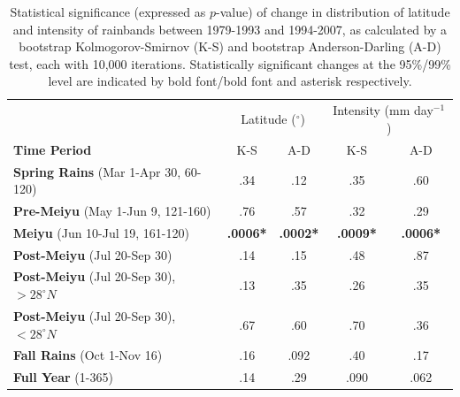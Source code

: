 \documentclass[singlecolumn,11pt]{pnas-new}
\begin{document}
\begin{table}[p]

\centering

\caption{Statistical significance (expressed as $p$-value) of change in distribution of latitude and intensity of rainbands between 1979-1993 and 1994-2007, as calculated by a bootstrap Kolmogorov-Smirnov (K-S) and bootstrap Anderson-Darling (A-D) test, each with 10,000 iterations. Statistically significant changes at the 95\%/99\% level are indicated by bold font/bold font and asterisk respectively.}

\begin{tabular}{ l c c c c}
												& \multicolumn{2}{c}{Latitude ($^\circ$)} & \multicolumn{2}{c}{Intensity (mm day$^{-1}$)} \\
	 \textbf{Time Period} 							& K-S 			& A-D 			& K-S 			& A-D \\
	 \hline
	\textbf{Spring Rains} (Mar 1-Apr 30, 60-120)  		& .34			& .12			& .35			& .60 \\
	\textbf{Pre-Meiyu} (May 1-Jun 9, 121-160)  		& .76			&  .57 			& .32			& .29 \\
	\textbf{Meiyu} (Jun 10-Jul 19, 161-120)			& \textbf{.0006*}	&  \textbf{.0002*}	&  \textbf{.0009*}	& \textbf{.0006*} \\	
	\textbf{Post-Meiyu} (Jul 20-Sep 30) 				& .14			&  .15 			&  .48			& .87 \\
	\textbf{Post-Meiyu} (Jul 20-Sep 30), $>28^{\circ}N$   & .13			&  .35 			&  .26 			& .35 \\	
	\textbf{Post-Meiyu} (Jul 20-Sep 30), $<28^{\circ}N$   & .67			&  .60			&  .70			& .36 \\	
	\textbf{Fall Rains} (Oct 1-Nov 16) 					& .16	 		&  .092			&  .40 			& .17 \\	
	\textbf{Full Year} (1-365)						& .14			&  .29			&  .090	 		& .062 \\	
	
\end{tabular}
\label{tab:s2}
\end{table}

\clearpage

\pnasbreak


\end{document}
